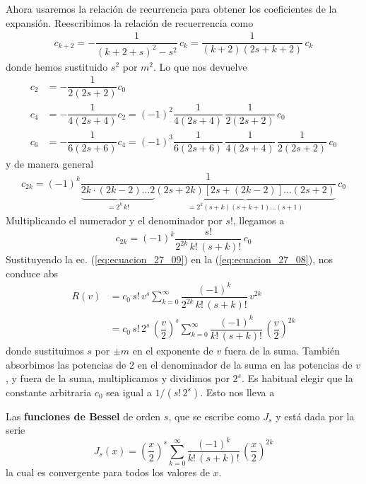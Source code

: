 \par
Ahora usaremos la relación de recurrencia para obtener los coeficientes de la expansión. Reescribimos la relación de recuerrencia como
\begin{align*}
c_{k+2} = - \dfrac{1}{(k + 2 + s)^{2} - s^{2}} \, c_{k} = \dfrac{1}{(k + 2)(2 s + k + 2)} \, c_{k}
\end{align*}
donde hemos sustituido $s^{2}$ por $m^{2}$. Lo que nos devuelve
\begin{align*}
c_{2} &= - \dfrac{1}{2 (2 s + 2)} c_{0} \\
c_{4} &= - \dfrac{1}{4 (2 s + 4)} c_{2} = (-1)^{2} \dfrac{1}{4 (2 s + 4)} \, \dfrac{1}{2 (2 s + 2)} \, c_{0} \\
c_{6} &= - \dfrac{1}{6 (2 s + 6)} c_{4} = (-1)^{3} \dfrac{1}{6 (2 s + 6)} \, \dfrac{1}{4 (2 s + 4)} \, \dfrac{1}{2 (2 s + 2)} \, c_{0}
\end{align*}
y de manera general
\begin{align*}
c_{2k} = (-1)^{k} \dfrac{1}{\underbrace{2 k \cdot (2 k - 2) \ldots 2}_{=2^{k} \, k!} \underbrace{(2 s + 2 k)[2 s + (2 k - 2)] \ldots (2 s + 2)}_{=2^{k} (s + k)(s + k + 1) \ldots (s + 1)}} \, c_{0}
\end{align*}
Multiplicando el numerador y el denominador por $s!$, llegamos a
\begin{equation}
c_{2k} = (-1)^{k} \dfrac{s!}{2^{2k} \, k! \, (s+k)!} \, c_{0}
\label{eq:ecuacion_27_09}
\end{equation}
Sustituyendo la ec. (\ref{eq:ecuacion_27_09}) en la (\ref{eq:ecuacion_27_08}), nos conduce abs
\begin{align*}
R(v) &= c_{0} \, s! \, v^{s} \sum_{k=0}^{\infty} \dfrac{(-1)^{k}}{2^{2k} \, k! \, (s + k)!} \, v^{2k} \\
&= c_{0} \, s! \, 2^{s} \, \left( \dfrac{v}{2} \right)^{s} \sum_{k=0}^{\infty} \dfrac{(-1)^{k}}{k! \, (s + k)!} \, \left( \dfrac{v}{2} \right)^{2 k} 
\end{align*}
donde sustituimos $s$ por $\pm m$ en el exponente de $v$ fuera de la suma. También absorbimos las potencias de $2$ en el denominador de la suma en las potencias de $v$, y fuera de la suma, multiplicamos y dividimos por $2^{s}$. Es habitual elegir que la constante arbitraria $c_{0}$ sea igual a $1/(s! \, 2^{s})$. Esto nos lleva a 
\begin{tcolorbox}
Las \textbf{funciones de Bessel} de orden $s$, que se escribe como $J_{s}$ y está dada por la serie
\begin{equation}
J_{s}(x) = \left( \dfrac{x}{2} \right)^{s} \sum_{k=0}^{\infty} \dfrac{(-1)^{k}}{k!\, (s + k)!} \, \left( \dfrac{x}{2} \right)^{2k}
\label{eq:ecuacion_27_10}
\end{equation}
la cual es convergente para todos los valores de $x$.
\end{tcolorbox}
